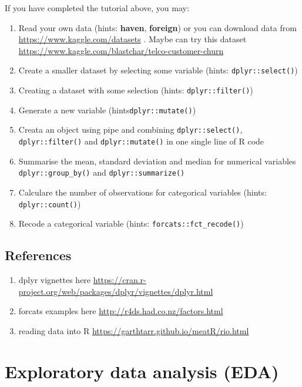 \documentclass[
]{book}
\providecommand{\tightlist}{%
  \setlength{\itemsep}{0pt}\setlength{\parskip}{0pt}}
\begin{document}
If you have completed the tutorial above, you may:

\begin{enumerate}
\def\labelenumi{\arabic{enumi}.}
\tightlist
\item
  Read your own data (hints: \textbf{haven}, \textbf{foreign}) or you can download data from \url{https://www.kaggle.com/datasets} . Maybe can try this dataset \url{https://www.kaggle.com/blastchar/telco-customer-churn}
\item
  Create a smaller dataset by selecting some variable (hints: \texttt{dplyr::select()})
\item
  Creating a dataset with some selection (hints: \texttt{dplyr::filter()})
\item
  Generate a new variable (hints\texttt{dplyr::mutate()})
\item
  Creata an object using pipe and combining \texttt{dplyr::select()}, \texttt{dplyr::filter()} and \texttt{dplyr::mutate()} in one single line of R code
\item
  Summarise the mean, standard deviation and median for numerical variables \texttt{dplyr::group\_by()} and \texttt{dplyr::summarize()}
\item
  Calculare the number of observations for categorical variables (hints: \texttt{dplyr::count()})
\item
  Recode a categorical variable (hints: \texttt{forcats::fct\_recode()})
\end{enumerate}

\hypertarget{references}{%
\section{References}\label{references}}

\begin{enumerate}
\def\labelenumi{\arabic{enumi}.}
\tightlist
\item
  dplyr vignettes here \url{https://cran.r-project.org/web/packages/dplyr/vignettes/dplyr.html}
\item
  forcats examples here \url{http://r4ds.had.co.nz/factors.html}
\item
  reading data into R \url{https://garthtarr.github.io/meatR/rio.html}
\end{enumerate}

\hypertarget{exploratory-data-analysis-eda}{%
\chapter{Exploratory data analysis (EDA)}\label{exploratory-data-analysis-eda}}
\end{document}
